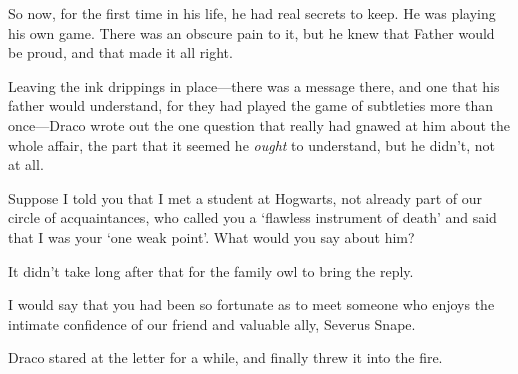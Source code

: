 So now, for the first time in his life, he had real secrets to keep. He was playing his own game. There was an obscure pain to it, but he knew that Father would be proud, and that made it all right.

Leaving the ink drippings in place—there was a message there, and one that his father would understand, for they had played the game of subtleties more than once—Draco wrote out the one question that really had gnawed at him about the whole affair, the part that it seemed he \emph{ought} to understand, but he didn't, not at all.

\begin{writtenNote}

Suppose I told you that I met a student at Hogwarts, not already part of our circle of acquaintances, who called you a `flawless instrument of death' and said that I was your `one weak point'. What would you say about him?

\end{writtenNote}

It didn't take long after that for the family owl to bring the reply.

\begin{writtenNote}

I would say that you had been so fortunate as to meet someone who enjoys the intimate confidence of our friend and valuable ally, Severus Snape.

\end{writtenNote}

Draco stared at the letter for a while, and finally threw it into the fire.

